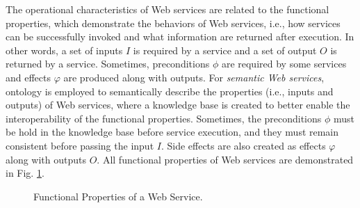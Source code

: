 The operational characteristics of Web services are related to the functional properties, which demonstrate the behaviors of Web services, i.e., how services can be successfully invoked and what information are returned after execution. In other words, a set of inputs $I$ is required by a service and a set of output $O$ is returned by a service. Sometimes, preconditions $\phi$ are required by some services and effects $\varphi$ are produced along with outputs. For \emph{semantic Web services}, ontology is employed to semantically describe the properties (i.e., inputs and outputs) of Web services, where a knowledge base is created to better enable the interoperability of the functional properties. Sometimes, the preconditions $\phi$ must be hold in the knowledge base before service execution, and they must remain consistent before passing the input $I$. Side effects are also created as effects $\varphi$ along with outputs $O$. All functional properties of Web services are demonstrated in Fig. \ref{fig:ws}.


\begin{figure}
\centerline{
}
\caption{Functional Properties of a Web Service.}
\label{fig:ws}
\end{figure}


